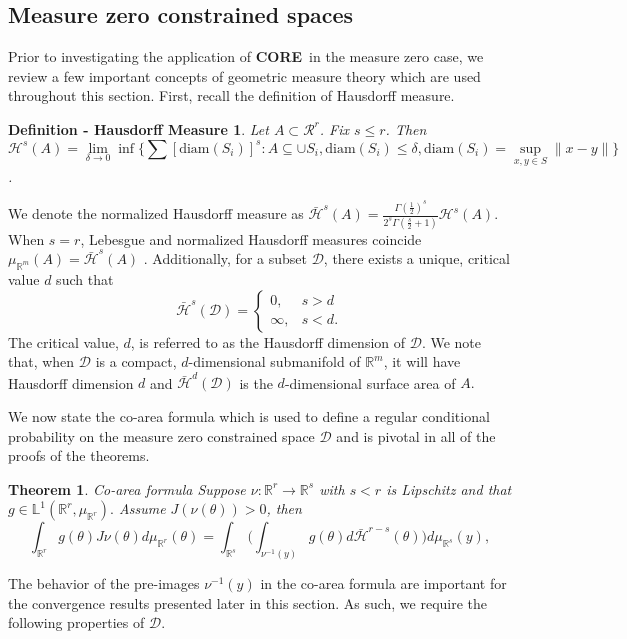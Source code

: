 \documentclass[10pt,fleqn]{article}
\newcommand{\core}{\textbf{CORE}}
\newtheorem{theorem}{Theorem}
\newtheorem*{Hausdorff_def}{Definition - Hausdorff Measure}
\newcommand{\mc}[1]{\mathcal{#1}}
\DeclareMathOperator{\1}{\mathbbm{1}}
\begin{document}
\subsection{Measure zero constrained spaces}
\label{SEC:Zero_measure_theory}
Prior to investigating the application of \core\, in the measure zero case, we review a few important concepts of geometric measure theory which are used throughout this section.  First, recall the definition of Hausdorff measure.
\begin{Hausdorff_def} Let $A\subset\mathcal{R}^r$. Fix $s \le r$. Then
$$\mc H^{s}(A)= \underset{\delta\rightarrow 0}\lim \inf \bigg\{ \sum \left[{\text{diam}(S_i)}\right]^s: {A\subseteq \cup S_i, \text{diam}(S_i)\le \delta}, \text{diam}(S_i)=\sup_{x,y\in S}\|x-y\|\bigg\}$$. 
\end{Hausdorff_def}
We denote the normalized Hausdorff measure as $\bar{\mc H}^{s}(A) =\frac{\Gamma(\frac{1}{2})^{s}}{2^s \Gamma(\frac{s}{2}+1)} \mc H^{s}(A)$. When $s=r$, Lebesgue and normalized Hausdorff measures coincide  $\mu_{\mathbb{R}^m}(A)= \bar{\mc H}^{s}(A)$ \citep{evans2015measure}.  Additionally, for a subset $\mathcal{D}$, there exists a unique, critical value $d$ such that $$\bar{\mathcal{H}}^s(\mathcal{D}) = \begin{cases} 0, & s > d  \\ \infty, & s < d. \end{cases}$$
The critical value, $d$, is referred to as the Hausdorff dimension of $\mathcal{D}$. We note that, when $\mathcal{D}$ is a compact, $d$-dimensional submanifold of $\mathbb{R}^m$, it will have Hausdorff dimension $d$ and $\bar{\mathcal{H}}^d(\mathcal{D})$ is the $d$-dimensional surface area of $A.$ 

We now state the co-area formula which is used to define a regular conditional probability on the measure zero constrained space $\mathcal{D}$ and is pivotal in all of the proofs of the theorems.
\begin{theorem}{Co-area formula \citep{diaconis2013manifold, federer2014geometric}} Suppose $\nu:\mathbb{R}^r\to\mathbb{R}^s$ with $ s<r$ is Lipschitz and that $g\in\mathbb{L}^1(\mathbb{R}^r,\mu_{\mathbb{R}^r}).$ Assume $J(\nu(\theta))>0$, then 
\begin{equation}
 \int_{\mathbb{R}^r}  g(\theta)J\nu(\theta)d\mu_{\mathbb{R}^r}( \theta)= \int_{\mathbb{R}^s} \bigg( \int_{\nu^{-1}(y)}g(\theta) d\bar{\mathcal{H}}^{r-s}(\theta)\bigg)d\mu_{\mathbb{R}^s}(y),
 \end{equation}
\end{theorem}
The behavior of the pre-images $\nu^{-1}(y)$ in the co-area formula are important for the convergence results presented later in this section.  As such,  we require the following properties of $\mathcal{D}$. 
\end{document}
